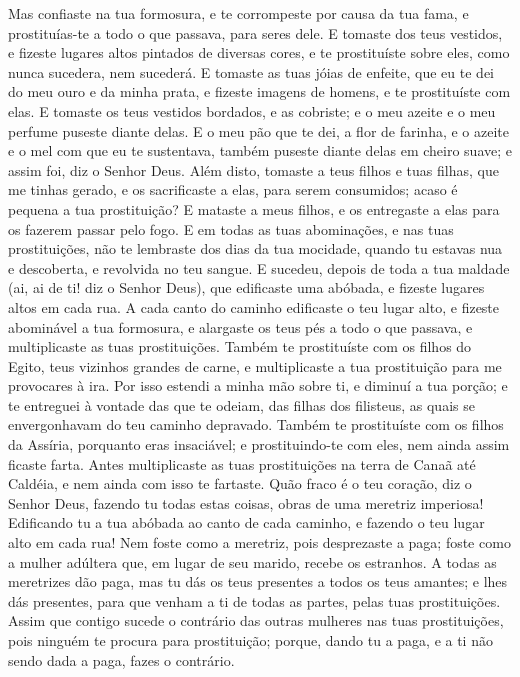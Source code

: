 Mas confiaste na tua formosura, e te corrompeste por causa da tua
fama, e prostituías-te a todo o que passava, para seres dele.
E tomaste dos teus vestidos, e fizeste lugares altos pintados
de diversas cores, e te prostituíste sobre eles, como nunca
sucedera, nem sucederá. E tomaste as tuas jóias de enfeite,
que eu te dei do meu ouro e da minha prata, e fizeste imagens de
homens, e te prostituíste com elas. E tomaste os teus
vestidos bordados, e as cobriste; e o meu azeite e o meu perfume
puseste diante delas. E o meu pão que te dei, a flor de
farinha, e o azeite e o mel com que eu te sustentava, também puseste
diante delas em cheiro suave; e assim foi, diz o Senhor Deus.
Além disto, tomaste a teus filhos e tuas filhas, que me
tinhas gerado, e os sacrificaste a elas, para serem consumidos;
acaso é pequena a tua prostituição? E mataste a meus filhos,
e os entregaste a elas para os fazerem passar pelo fogo. E em
todas as tuas abominações, e nas tuas prostituições, não te
lembraste dos dias da tua mocidade, quando tu estavas nua e
descoberta, e revolvida no teu sangue. E sucedeu, depois de
toda a tua maldade (ai, ai de ti! diz o Senhor Deus), que
edificaste uma abóbada, e fizeste lugares altos em cada rua.
A cada canto do caminho edificaste o teu lugar alto, e
fizeste abominável a tua formosura, e alargaste os teus pés a todo o
que passava, e multiplicaste as tuas prostituições. Também te
prostituíste com os filhos do Egito, teus vizinhos grandes de carne,
e multiplicaste a tua prostituição para me provocares à ira.
Por isso estendi a minha mão sobre ti, e diminuí a tua
porção; e te entreguei à vontade das que te odeiam, das filhas dos
filisteus, as quais se envergonhavam do teu caminho depravado.
Também te prostituíste com os filhos da Assíria, porquanto
eras insaciável; e prostituindo-te com eles, nem ainda assim ficaste
farta. Antes multiplicaste as tuas prostituições na terra de
Canaã até Caldéia, e nem ainda com isso te fartaste. Quão
fraco é o teu coração, diz o Senhor Deus, fazendo tu todas estas
coisas, obras de uma meretriz imperiosa! Edificando tu a tua
abóbada ao canto de cada caminho, e fazendo o teu lugar alto em cada
rua! Nem foste como a meretriz, pois desprezaste a paga;
foste como a mulher adúltera que, em lugar de seu marido,
recebe os estranhos. A todas as meretrizes dão paga, mas tu
dás os teus presentes a todos os teus amantes; e lhes dás presentes,
para que venham a ti de todas as partes, pelas tuas prostituições.
Assim que contigo sucede o contrário das outras mulheres nas
tuas prostituições, pois ninguém te procura para prostituição;
porque, dando tu a paga, e a ti não sendo dada a paga, fazes o
contrário.

